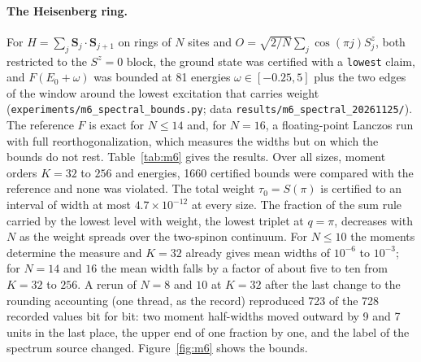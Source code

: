 \documentclass[11pt,a4paper]{article}
\newcommand{\code}[1]{\texttt{#1}}
\begin{document}
\paragraph{The Heisenberg ring.}
For $H=\sum_j\mathbf S_j\cdot\mathbf S_{j+1}$ on rings of $N$ sites and $O=\sqrt{2/N}\sum_j\cos(\pi j)S^z_j$, both
restricted to the $S^z=0$ block, the ground state was certified with a \code{lowest} claim, and $F(E_0+\omega)$ was
bounded at 81 energies $\omega\in[-0.25,5]$ plus the two edges of the window around the lowest excitation that carries
weight (\code{experiments/m6\_spectral\_bounds.py}; data \code{results/m6\_spectral\_20261125/}). The reference $F$ is
exact for $N\le14$ and, for $N=16$, a floating-point Lanczos run with full reorthogonalization, which measures the
widths but on which the bounds do not rest. Table~\ref{tab:m6} gives the results. Over all sizes, moment orders
$K=32$ to $256$ and energies, 1660 certified bounds were compared with the reference and none was violated. The total
weight $\tau_0=S(\pi)$ is certified to an interval of width at most $4.7\times10^{-12}$ at every size. The fraction
of the sum rule carried by the lowest level with weight, the lowest triplet at $q=\pi$, decreases with $N$ as the
weight spreads over the two-spinon continuum. For $N\le10$ the moments determine the measure and $K=32$ already gives
mean widths of $10^{-6}$ to $10^{-3}$; for $N=14$ and $16$ the mean width falls by a factor of about five to ten from
$K=32$ to $256$. A rerun of $N=8$ and $10$ at $K=32$ after the last change to the rounding accounting (one thread, as the record)
reproduced 723 of the 728 recorded values bit for bit: two moment half-widths moved outward by 9 and 7 units in the
last place, the upper end of one fraction by one, and the label of the spectrum source changed. Figure~\ref{fig:m6}
shows the bounds.
\end{document}

